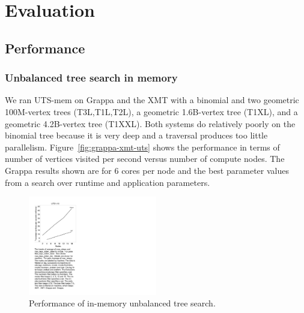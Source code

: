 \section{Evaluation} \label{sec:evaluation}


\subsection{Performance}



\subsubsection{Unbalanced tree search in memory}



We ran UTS-mem on Grappa and the XMT with a binomial and two geometric
100M-vertex trees (T3L,T1L,T2L), a geometric 1.6B-vertex tree (T1XL),
and a geometric 4.2B-vertex tree (T1XXL). Both systems do relatively
poorly on the binomial tree because it is very deep and a traversal
produces too little parallelism. Figure~\ref{fig:grappa-xmt-uts} shows
the performance in terms of number of vertices visited per second versus
number of compute nodes. The Grappa results shown are for 6 cores per
node and the best parameter values from a search over runtime and
application parameters.



\begin{figure}[ht]
    \begin{center}
      \includegraphics[width=0.5\textwidth]{figs/uts_performance.pdf}
    \end{center}
    \caption{Performance of in-memory unbalanced tree search.}
    \label{fig:uts_compare}
\end{figure}


